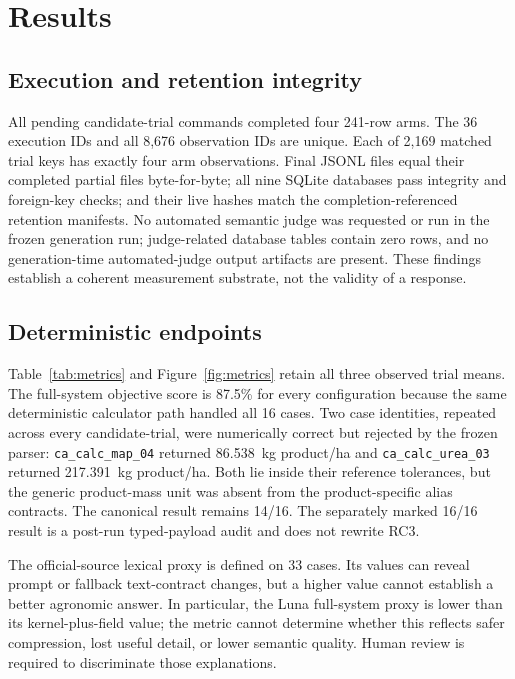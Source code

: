 \documentclass[9pt,twocolumn]{article}
\newcommand{\RCTrials}{pending}
\begin{document}
\section{Results}

\subsection{Execution and retention integrity}

All \RCTrials{} candidate-trial commands completed four 241-row arms. The 36 execution IDs and all 8,676 observation IDs are unique. Each of 2,169 matched trial keys has exactly four arm observations. Final JSONL files equal their completed partial files byte-for-byte; all nine SQLite databases pass integrity and foreign-key checks; and their live hashes match the completion-referenced retention manifests. No automated semantic judge was requested or run in the frozen generation run; judge-related database tables contain zero rows, and no generation-time automated-judge output artifacts are present. These findings establish a coherent measurement substrate, not the validity of a response.

\subsection{Deterministic endpoints}

Table~\ref{tab:metrics} and Figure~\ref{fig:metrics} retain all three observed trial means. The full-system objective score is 87.5\% for every configuration because the same deterministic calculator path handled all 16 cases. Two case identities, repeated across every candidate-trial, were numerically correct but rejected by the frozen parser: \texttt{ca\_calc\_map\_04} returned 86.538~kg product/ha and \texttt{ca\_calc\_urea\_03} returned 217.391~kg product/ha. Both lie inside their reference tolerances, but the generic product-mass unit was absent from the product-specific alias contracts. The canonical result remains 14/16. The separately marked 16/16 result is a post-run typed-payload audit and does not rewrite RC3.

The official-source lexical proxy is defined on 33 cases. Its values can reveal prompt or fallback text-contract changes, but a higher value cannot establish a better agronomic answer. In particular, the Luna full-system proxy is lower than its kernel-plus-field value; the metric cannot determine whether this reflects safer compression, lost useful detail, or lower semantic quality. Human review is required to discriminate those explanations.
\end{document}
